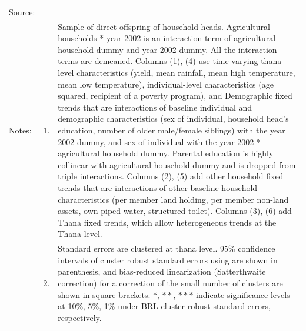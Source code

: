 \documentclass[12pt,letterpaper]{article}
\newcommand{\0}{\ensuremath{\mbox{\boldmath $0$}}}
\begin{document}
{\begin{table}
\renewcommand{\arraystretch}{1}
\hfil\begin{tabular}{>{\hfill\scriptsize}p{1cm}<{}>{\hfill\scriptsize}p{.25cm}<{}>{\scriptsize}p{.7\paperwidth}<{\hfill}}
Source:& \multicolumn{2}{l}{\scriptsize Compiled from IFPRI data. }\\[-1ex]
Notes:& 1. & Sample of direct offspring of household heads. \textsf{Agricultural households * year 2002} is an interaction term of agricultural household dummy and year 2002 dummy. All the interaction terms are demeaned. Columns \textsf{(1), (4)} use time-varying thana-level characteristics (yield, mean rainfall, mean high temperature, mean low temperature), individual-level characteristics (age squared, recipient of a poverty program), and \textsf{Demographic fixed trends} that are interactions of baseline individual and demographic characteristics (sex of individual, household head's education, number of older male/female siblings) with the year 2002 dummy, and sex of individual with the year 2002 * agricultural household dummy. Parental education is highly collinear with agricultural household dummy and is dropped from triple interactions. Columns \textsf{(2), (5)} add \textsf{other household fixed trends} that are interactions of other baseline household characteristics (per member land holding, per member non-land assets, own piped water, structured toilet). Columns \textsf{(3), (6)} add \textsf{Thana fixed trends}, which allow heterogeneous trends at the Thana level. \\[-1ex]
& 2. & Standard errors are clustered at thana level. 95\% confidence intervals of cluster robust standard errors using \cite{liang1986longitudinal} are shown in parenthesis, and bias-reduced linearization (Satterthwaite correction) for a correction of the small number of clusters are shown in square brackets. $*$, $**$, $***$ indicate significance levels at 10\%, 5\%, 1\% under BRL cluster robust standard errors, respectively. \end{tabular}
\end{table}



}
\end{document}

